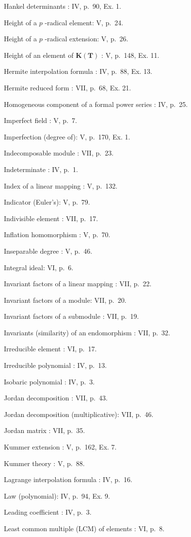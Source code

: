 Hankel determinants : IV, p.~90, Ex. 1.

Height of a \(p\) -radical element: V, p.~24.

Height of a \(p\) -radical extension: V, p.~26.

Height of an element of \(\mathbf{K}(\mathbf{T})\) : V, p.~148, Ex. 11.

Hermite interpolation formula : IV, p.~88, Ex. 13.

Hermite reduced form : VII, p.~68, Ex. 21.

Homogeneous component of a formal power series : IV, p.~25.

Imperfect field : V, p.~7.

Imperfection (degree of): V, p.~170, Ex. 1.

Indecomposable module : VII, p.~23.

Indeterminate : IV, p.~1.

Index of a linear mapping : V, p.~132.

Indicator (Euler's): V, p.~79.

Indivisible element : VII, p.~17.

Inflation homomorphism : V, p.~70.

Inseparable degree : V, p.~46.

Integral ideal: VI, p.~6.

Invariant factors of a linear mapping : VII, p.~22.

Invariant factors of a module: VII, p.~20.

Invariant factors of a submodule : VII, p.~19.

Invariants (similarity) of an endomorphism : VII, p.~32.

Irreducible element : VI, p.~17.

Irreducible polynomial : IV, p.~13.

Isobaric polynomial : IV, p.~3.

Jordan decomposition : VII, p.~43.

Jordan decomposition (multiplicative): VII, p.~46.

Jordan matrix : VII, p.~35.

Kummer extension : V, p.~162, Ex. 7.

Kummer theory : V, p.~88.

Lagrange interpolation formula : IV, p.~16.

Law (polynomial): IV, p.~94, Ex. 9.

Leading coefficient : IV, p.~3.

Least common multiple (LCM) of elements : VI, p.~8.

